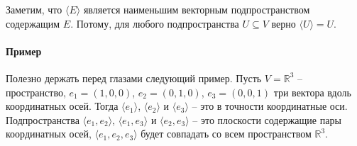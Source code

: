 Заметим, что $\langle E \rangle$ является наименьшим векторным подпространством содержащим $E$.
Потому, для любого подпространства $U\subseteq V$ верно $\langle U \rangle  = U$.


\paragraph{Пример}

Полезно держать перед глазами следующий пример.
Пусть $V = \mathbb R^3$ -- пространство, $e_1 =(1,0,0)$, $e_2 = (0,1,0)$, $e_3 = (0,0,1)$ три вектора вдоль координатных осей.
Тогда $\langle e_1\rangle$, $\langle e_2\rangle$ и $\langle e_3\rangle$ -- это в точности координатные оси.
Подпространства $\langle e_1, e_2\rangle$, $\langle e_1, e_3\rangle$ и $\langle e_2, e_3\rangle$ -- это плоскости содержащие пары координатных осей, $\langle e_1, e_2, e_3\rangle$ будет совпадать со всем пространством $\mathbb R^3$.

